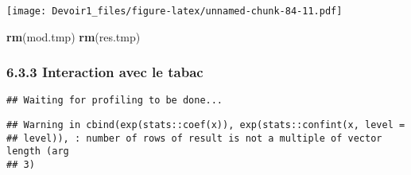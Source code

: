 \documentclass[]{article}
\newenvironment{Shaded}{\begin{snugshade}}{\end{snugshade}}
\newcommand{\KeywordTok}[1]{\textcolor[rgb]{0.13,0.29,0.53}{\textbf{#1}}}
\newcommand{\DataTypeTok}[1]{\textcolor[rgb]{0.13,0.29,0.53}{#1}}
\newcommand{\DecValTok}[1]{\textcolor[rgb]{0.00,0.00,0.81}{#1}}
\newcommand{\StringTok}[1]{\textcolor[rgb]{0.31,0.60,0.02}{#1}}
\newcommand{\OperatorTok}[1]{\textcolor[rgb]{0.81,0.36,0.00}{\textbf{#1}}}
\newcommand{\NormalTok}[1]{#1}
\begin{document}
\texttt{[image: Devoir1\_files/figure-latex/unnamed-chunk-84-11.pdf]}

\begin{Shaded}
\begin{Highlighting}[]
\KeywordTok{rm}\NormalTok{(mod.tmp)}
\KeywordTok{rm}\NormalTok{(res.tmp)}
\end{Highlighting}
\end{Shaded}

\subsubsection{6.3.3 Interaction avec le
tabac}\label{interaction-avec-le-tabac}

\begin{Shaded}
\end{Shaded}

\begin{verbatim}
## Waiting for profiling to be done...
\end{verbatim}

\begin{verbatim}
## Warning in cbind(exp(stats::coef(x)), exp(stats::confint(x, level =
## level)), : number of rows of result is not a multiple of vector length (arg
## 3)
\end{verbatim}
\end{document}
